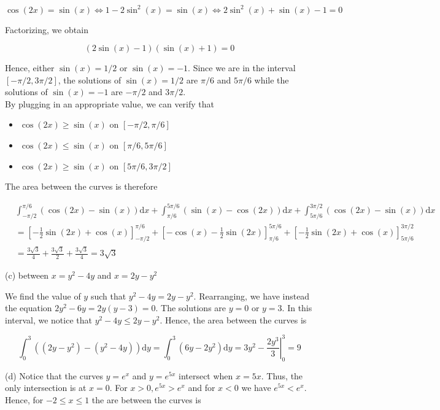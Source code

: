 \documentclass[10pt]{article}
\begin{document}
$$
\cos (2 x)=\sin (x) \Longleftrightarrow 1-2 \sin ^{2}(x)=\sin (x) \Longleftrightarrow 2 \sin ^{2}(x)+\sin (x)-1=0
$$

Factorizing, we obtain

$$
(2 \sin (x)-1)(\sin (x)+1)=0
$$

Hence, either $\sin (x)=1 / 2$ or $\sin (x)=-1$. Since we are in the interval $[-\pi / 2,3 \pi / 2]$, the solutions of $\sin (x)=1 / 2$ are $\pi / 6$ and $5 \pi / 6$ while the solutions of $\sin (x)=-1$ are $-\pi / 2$ and $3 \pi / 2$.\\
By plugging in an appropriate value, we can verify that

\begin{itemize}
  \item $\cos (2 x) \geq \sin (x)$ on $[-\pi / 2, \pi / 6]$
  \item $\cos (2 x) \leq \sin (x)$ on $[\pi / 6,5 \pi / 6]$
  \item $\cos (2 x) \geq \sin (x)$ on $[5 \pi / 6,3 \pi / 2]$
\end{itemize}

The area between the curves is therefore

$$
\begin{aligned}
& \int_{-\pi / 2}^{\pi / 6}(\cos (2 x)-\sin (x)) \mathrm{d} x+\int_{\pi / 6}^{5 \pi / 6}(\sin (x)-\cos (2 x)) \mathrm{d} x+\int_{5 \pi / 6}^{3 \pi / 2}(\cos (2 x)-\sin (x)) \mathrm{d} x \\
& =\left[-\frac{1}{2} \sin (2 x)+\cos (x)\right]_{-\pi / 2}^{\pi / 6}+\left[-\cos (x)-\frac{1}{2} \sin (2 x)\right]_{\pi / 6}^{5 \pi / 6}+\left[-\frac{1}{2} \sin (2 x)+\cos (x)\right]_{5 \pi / 6}^{3 \pi / 2} \\
& =\frac{3 \sqrt{3}}{4}+\frac{3 \sqrt{3}}{2}+\frac{3 \sqrt{3}}{4}=3 \sqrt{3}
\end{aligned}
$$

(c) between $x=y^{2}-4 y$ and $x=2 y-y^{2}$

We find the value of $y$ such that $y^{2}-4 y=2 y-y^{2}$. Rearranging, we have instead the equation $2 y^{2}-6 y=2 y(y-3)=0$. The solutions are $y=0$ or $y=3$. In this interval, we notice that $y^{2}-4 y \leq 2 y-y^{2}$. Hence, the area between the curves is

$$
\int_{0}^{3}\left(\left(2 y-y^{2}\right)-\left(y^{2}-4 y\right)\right) \mathrm{d} y=\int_{0}^{3}\left(6 y-2 y^{2}\right) \mathrm{d} y=3 y^{2}-\left.\frac{2 y^{3}}{3}\right|_{0} ^{3}=9
$$

(d) Notice that the curves $y=e^{x}$ and $y=e^{5 x}$ intersect when $x=5 x$. Thus, the only intersection is at $x=0$. For $x>0, e^{5 x}>e^{x}$ and for $x<0$ we have $e^{5 x}<e^{x}$. Hence, for $-2 \leq x \leq 1$ the are between the curves is
\end{document}
